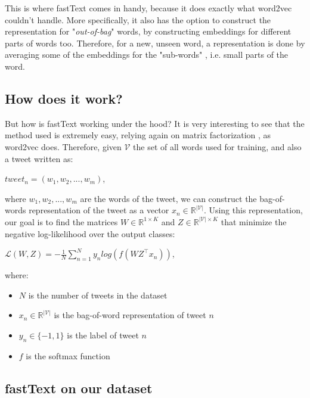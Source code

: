 \documentclass[10pt,conference,compsocconf]{IEEEtran}
\def\bR{\mathbb{R}}
\begin{document}
This is where fastText comes in handy, because it does exactly what word2vec couldn't handle. More specifically, it also has the option to construct the representation for "\textit{out-of-bag}" words, by constructing embeddings for different parts of words too. Therefore, for a new, unseen word, a representation is done by averaging some of the embeddings for the "sub-words" \cite{BGJ16+}, i.e. small parts of the word. 

\subsection{How does it work?}

But how is fastText working under the hood? It is very interesting to see that the method used is extremely easy, relying again on matrix factorization \cite{LeS00}, as word2vec does. Therefore, given $\mathcal{V}$ the set of all words used for training, and also a tweet written as:
\begin{center}
	$tweet_n = (w_1, w_2,...,w_m)$,
\end{center}

where $w_1,w_2,...,w_m$ are the words of the tweet, we can construct the bag-of-words representation of the tweet as a vector $x_n \in \bR^{\mathcal{|V|}}$. Using this representation, our goal is to find the matrices $W \in \bR^{1\times K}$ and $Z \in \bR^{|\mathcal{V}| \times K}$ that minimize the negative log-likelihood over the output classes: 

\begin{center}
	$\mathcal{L}(W, Z) = - \frac{1}{N} \sum\limits_{n=1}^{N} y_n log (f(WZ^\top x_n))$,
\end{center}

where:

\begin{itemize}
	\item $N$ is the number of tweets in the dataset
	\item $x_n \in \bR^{|\mathcal{V}|}$ is the bag-of-word representation of tweet $n$
	\item $y_n \in \{-1, 1\}$ is the label of tweet $n$
	\item $f$ is the softmax function
\end{itemize}

\subsection{fastText on our dataset}
\end{document}
